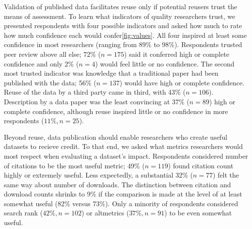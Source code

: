 \documentclass[10pt]{article}
\begin{document}
Validation of published data facilitates reuse only if potential reusers trust the means of assessment.
To learn what indicators of quality researchers trust, we presented respondents with four possible indicators and asked how much to rate how much confidence each would confer\ref{fig:values}.
All four inspired at least some confidence in most researchers (ranging from 89\% to 98\%).
Respondents trusted peer review above all else; 72\% ($n=175$) said it conferred high or complete confidence and only 2\% ($n=4$) would feel little or no confidence.
The second most trusted indicator was knowledge that a traditional paper had been published with the data; 56\% ($n=137$) would have high or complete confidence.
Reuse of the data by a third party came in third, with 43\% ($n=106$). 
Description by a data paper was the least convincing at 37\% ($n=89$) high or complete confidence, although reuse inspired little or no confidence in more respondents ($11\%, n=25$).

Beyond reuse, data publication should enable researchers who create useful datasets to recieve credit.
To that end, we asked what metrics researchers would most respect when evaluating a dataset's impact.
Respondents considered number of citations to be the most useful metric; 49\% ($n=119$) found citation count highly or extremely useful. 
Less expectedly, a substantial 32\% ($n=77$) felt the same way about number of downloads.
The distinction between citation and download counts shrinks to 9\% if the comparison is made at the level of at least somewhat useful (82\% versus 73\%).
Only a minority of respondents considered search rank ($42\%, n=102$) or altmetrics ($37\%, n=91$) to be even somewhat useful.
\end{document}
